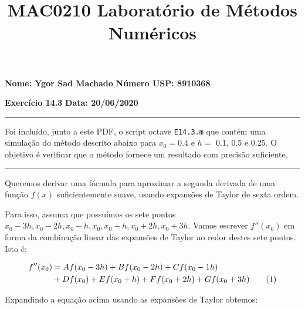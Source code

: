 \documentclass[11pt]{amsart}
\newcommand\numberthis{\addtocounter{equation}{1}\tag{\theequation}}
\newcommand\blockskip{\bigskip\medskip}
\begin{document}
\parindent=0pt

\title[MAC0210]
{MAC0210 Laboratório de Métodos Numéricos}\vspace{3\jot}%

\footskip=28pt

\maketitle
\thispagestyle{empty} 
\pagestyle{plain}

\textbf{Nome: Ygor Sad Machado}\hfill
\textbf{Número USP: 8910368}\null

\medskip
\textbf{Exercício 14.3}\hfill
\textbf{Data: 20/06/2020}\null

\rule{\textwidth}{0.4pt}
\medskip

Foi incluído, junto a este PDF, o script octave \verb|E14.3.m| que contém uma simulação do método descrito abaixo para $x_0 = 0.4$ e $h =$ 0.1, 0.5 e 0.25. O objetivo é verificar que o método fornece um resultado com precisão suficiente.

\bigskip
\rule{\textwidth}{0.4pt}
\medskip

Queremos derivar uma fórmula para aproximar a segunda derivada de uma função $f(x)$ suficientemente suave, usando expansões de Taylor de sexta ordem.

\medskip
Para isso, assuma que possuímos os sete pontos $x_0 - 3h, x_0 - 2h, x_0 - h, x_0, x_0 + h, x_0 + 2h, x_0 + 3h$. Vamos escrever $f''(x_0)$ em forma da combinação linear das expansões de Taylor ao redor destes sete pontos. Isto é:

\begin{align*}
    f''(x_0) &= Af(x_0 - 3h) + Bf(x_0 - 2h) + Cf(x_0 - 1h)\\ 
             &+ Df(x_0) + Ef(x_0 + h) + Ff(x_0 + 2h) + Gf(x_0 + 3h) \numberthis\label{f_2_linear_comb}\\
\end{align*}

\blockskip
Expandindo a equação acima usando as expansões de Taylor obtemos:
\end{document}
